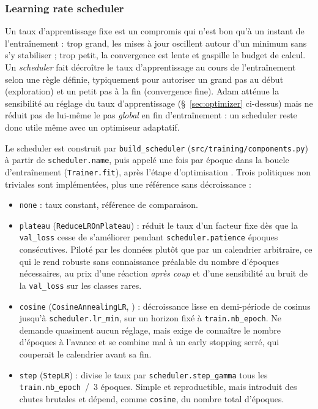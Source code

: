 \subsubsection{Learning rate scheduler}

Un taux d’apprentissage fixe est un compromis qui n’est bon qu’à un instant de l’entraînement : trop grand, les mises à jour oscillent autour d’un minimum sans s’y stabiliser ; trop petit, la convergence est lente et gaspille le budget de calcul.
Un \emph{scheduler} fait décroître le taux d’apprentissage au cours de l’entraînement selon une règle définie, typiquement pour autoriser un grand pas au début (exploration) et un petit pas à la fin (convergence fine).
Adam atténue la sensibilité au réglage du taux d’apprentissage (\S~\ref{sec:optimizer} ci-dessus) mais ne réduit pas de lui-même le pas \emph{global} en fin d’entraînement : un scheduler reste donc utile même avec un optimiseur adaptatif.

Le scheduler est construit par \texttt{build\_scheduler} (\texttt{src/training/components.py}) à partir de \texttt{scheduler.name}, puis appelé une fois par époque dans la boucle d’entraînement (\texttt{Trainer.fit}), après l’étape d’optimisation \parencite{pytorchoptim}.
Trois politiques non triviales sont implémentées, plus une référence sans décroissance :

\begin{itemize}
  \item \texttt{none} : taux constant, référence de comparaison.
  \item \texttt{plateau} (\texttt{ReduceLROnPlateau}) : réduit le taux d’un facteur fixe dès que la \texttt{val\_loss} cesse de s’améliorer pendant \texttt{scheduler.patience} époques consécutives. Piloté par les données plutôt que par un calendrier arbitraire, ce qui le rend robuste sans connaissance préalable du nombre d’époques nécessaires, au prix d’une réaction \emph{après coup} et d’une sensibilité au bruit de la \texttt{val\_loss} sur les classes rares.
  \item \texttt{cosine} (\texttt{CosineAnnealingLR}, \parencite{loshchilov2017sgdr}) : décroissance lisse en demi-période de cosinus jusqu’à \texttt{scheduler.lr\_min}, sur un horizon fixé à \texttt{train.nb\_epoch}. Ne demande quasiment aucun réglage, mais exige de connaître le nombre d’époques à l’avance et se combine mal à un early stopping serré, qui couperait le calendrier avant sa fin.
  \item \texttt{step} (\texttt{StepLR}) : divise le taux par \texttt{scheduler.step\_gamma} tous les \texttt{train.nb\_epoch}~/~3 époques. Simple et reproductible, mais introduit des chutes brutales et dépend, comme \texttt{cosine}, du nombre total d’époques.
\end{itemize}

